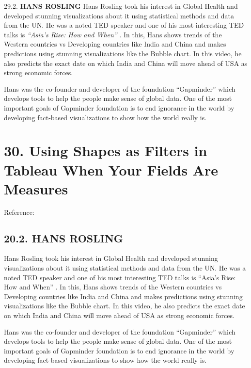 \documentclass[]{book}
\theoremstyle{definition}
\theoremstyle{definition}
\theoremstyle{definition}
\theoremstyle{remark}
\begin{document}
29.2. \textbf{HANS ROSLING} Hans Rosling took his interest in Global
Health and developed stunning visualizations about it using statistical
methods and data from the UN. He was a noted TED speaker and one of his
most interesting TED talks is \emph{``Asia's Rise: How and When''}
\citep{hans}. In this, Hans shows trends of the Western countries vs
Developing countries like India and China and makes predictions using
stunning visualizations like the Bubble chart. In this video, he also
predicts the exact date on which India and China will move ahead of USA
as strong economic forces.

Hans was the co-founder and developer of the foundation
``Gapminder''\citep{gapminder} which develops tools to help the people
make sense of global data. One of the most important goals of Gapminder
foundation is to end ignorance in the world by developing fact-based
visualizations to show how the world really is.

\section{30. Using Shapes as Filters in Tableau When Your Fields Are
Measures}\label{using-shapes-as-filters-in-tableau-when-your-fields-are-measures}

Reference: \citep{interworks}

\subsection{20.2. HANS ROSLING}\label{hans-rosling}

Hans Rosling took his interest in Global Health and developed stunning
visualizations about it using statistical methods and data from the UN.
He was a noted TED speaker and one of his most interesting TED talks is
``Asia's Rise: How and When'' \citep{hans}. In this, Hans shows trends
of the Western countries vs Developing countries like India and China
and makes predictions using stunning visualizations like the Bubble
chart. In this video, he also predicts the exact date on which India and
China will move ahead of USA as strong economic forces.

Hans was the co-founder and developer of the foundation
``Gapminder''\citep{gapminder} which develops tools to help the people
make sense of global data. One of the most important goals of Gapminder
foundation is to end ignorance in the world by developing fact-based
visualizations to show how the world really is.
\end{document}
